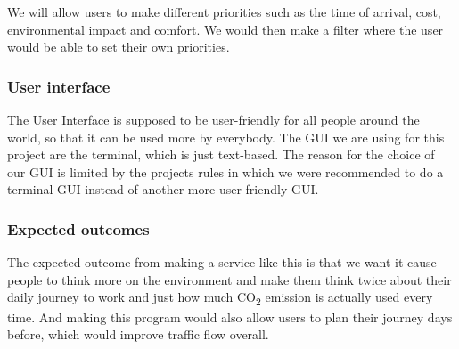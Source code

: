 We will allow users to make different priorities such as the time of arrival, cost, environmental impact and comfort.
We would then make a filter where the user would be able to set their own priorities.

\subsubsection{User interface}

The User Interface is supposed to be user-friendly for all people around the world, so that it can be used more by
everybody.
The GUI we are using for this project are the terminal, which is just text-based.
The reason for the choice of our GUI is limited by the projects rules in which we were recommended to do a terminal GUI
instead of another more user-friendly GUI\@.

\subsubsection{Expected outcomes}

The expected outcome from making a service like this is that we want it cause people to think more on the environment
and make them think twice about their daily journey to work and just how much \unit{CO_{2}} emission is actually used
every time.
And making this program would also allow users to plan their journey days before, which would improve traffic flow
overall.
